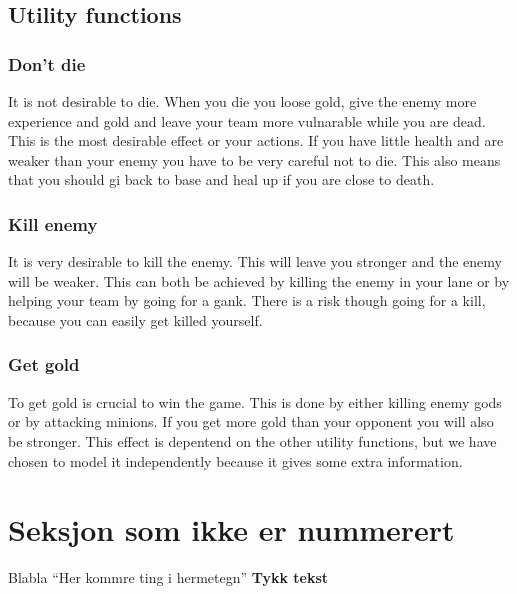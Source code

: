 \documentclass[titlepage]{article}
\begin{document}
\subsection{Utility functions}
\subsubsection*{Don't die}
It is not desirable to die. When you die you loose gold, give the enemy more experience and gold and leave your team more vulnarable while you are dead. This is the most desirable effect or your actions. If you have little health and are weaker than your enemy you have to be very careful not to die. This also means that you should gi back to base and heal up if you are close to death.
\subsubsection*{Kill enemy}
It is very desirable to kill the enemy. This will leave you stronger and the enemy will be weaker. This can both be achieved by killing the enemy in your lane or by helping your team by going for a gank. There is a risk though going for a kill, because you can easily get killed yourself.
\subsubsection*{Get gold}
To get gold is crucial to win the game. This is done by either killing enemy gods or by attacking minions. If you get more gold than your opponent you will also be stronger. This effect is depentend on the other utility functions, but we have chosen to model it independently because it gives some extra information. 



\newpage

\section*{Seksjon som ikke er nummerert}
Blabla
``Her kommre ting i hermetegn'' %
\textbf{Tykk tekst}
\end{document}
